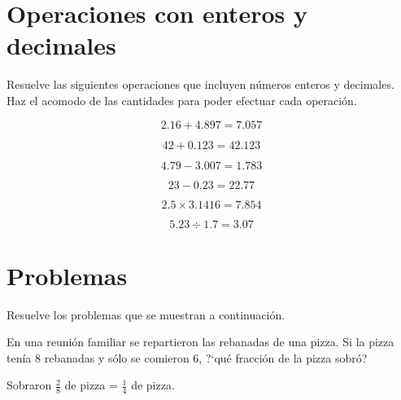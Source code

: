 \documentclass[11pt]{article}
\begin{document}
\vspace{0.7cm}

\section{Operaciones con enteros y decimales}
Resuelve las siguientes operaciones que incluyen n\'umeros enteros y decimales.
Haz el acomodo de las cantidades para poder efectuar cada operaci\'on.

\begin{multicols}{2}

\begin{equation*}    2.16 + 4. 897= 7.057    \end{equation*}

\begin{equation*}    42 + 0. 123= 42.123     \end{equation*}

\begin{equation*}    4.79 - 3.007= 1.783     \end{equation*}

\begin{equation*}    23 - 0.23= 22.77        \end{equation*}

\begin{equation*}    2.5 \times 3.1416= 7.854\end{equation*}

\begin{equation*}    5.23 \div 1.7= 3.07     \end{equation*}

\end{multicols}

\vspace{1cm}

\section{Problemas}
Resuelve los problemas que se muestran a continuaci\'on.

\vspace{1.5cm}

En una reuni\'on familiar se repartieron las rebanadas de una pizza. Si la pizza
ten\'ia 8 rebanadas y s\'olo se comieron 6, ?`qu\'e fracci\'on de la pizza
sobr\'o?

\vspace{1.5cm}

\qquad \qquad Sobraron $\displaystyle\frac{2}{8}$ de pizza = $\displaystyle\frac{1}{4}$ de pizza.
\end{document}
